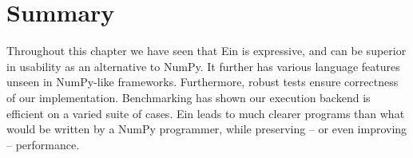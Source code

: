 \needspace{2em}
\section{Summary}

Throughout this chapter we have seen that Ein is expressive, and can be superior in usability as an alternative to NumPy. 
It further has various language features unseen in NumPy-like frameworks.
Furthermore, robust tests ensure correctness of our implementation. 
Benchmarking has shown our execution backend is efficient on a varied suite of cases. 
Ein leads to much clearer programs than what would be written by a NumPy programmer, while preserving -- or even improving -- performance. 

